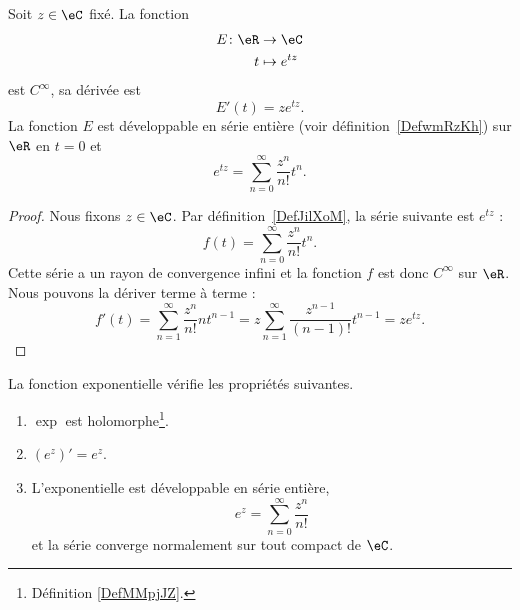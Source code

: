 \begin{proposition}
	Soit \( z\in\eC\) fixé. La fonction
	\begin{equation}
		\begin{aligned}
			E\colon \eR & \to \eC         \\
			t           & \mapsto  e^{tz}
		\end{aligned}
	\end{equation}
	est  \(  C^{\infty}\), sa dérivée est
	\begin{equation}
		E'(t)=z e^{tz}.
	\end{equation}
	La fonction \( E\) est développable en série entière (voir définition~\ref{DefwmRzKh}) sur \( \eR\) en \( t=0\) et
	\begin{equation}
		e^{tz}=\sum_{n=0}^{\infty}\frac{ z^n }{ n! }t^n.
	\end{equation}
\end{proposition}

\begin{proof}
	Nous fixons \( z\in \eC\). Par définition~\ref{DefJilXoM}, la série suivante est \(  e^{tz}\) :
	\begin{equation}
		f(t)=\sum_{n=0}^{\infty}\frac{ z^n }{ n! }t^n.
	\end{equation}
	Cette série a un rayon de convergence infini et la fonction \( f\) est donc \(  C^{\infty}\) sur \( \eR\). Nous pouvons la dériver terme à terme :
	\begin{equation}
		f'(t)=\sum_{n=1}^{\infty}\frac{ z^n }{ n! }nt^{n-1}
		=z\sum_{n=1}^{\infty}\frac{ z^{n-1} }{ (n-1)! }t^{n-1}
		=z e^{tz}.
	\end{equation}
\end{proof}

\begin{theorem}     \label{THOooNGOIooEECfAv}
	La fonction exponentielle vérifie les propriétés suivantes.
	\begin{enumerate}
		\item
		      \( \exp\) est holomorphe\footnote{Définition \ref{DefMMpjJZ}.}.
		\item
		      \( (e^z)'=e^z\).
		\item
		      L'exponentielle est développable en série entière,
		      \begin{equation}
			      e^z=\sum_{n=0}^{\infty}\frac{ z^n }{ n! }
		      \end{equation}
		      et la série converge normalement sur tout compact de \( \eC\).
	\end{enumerate}
\end{theorem}

